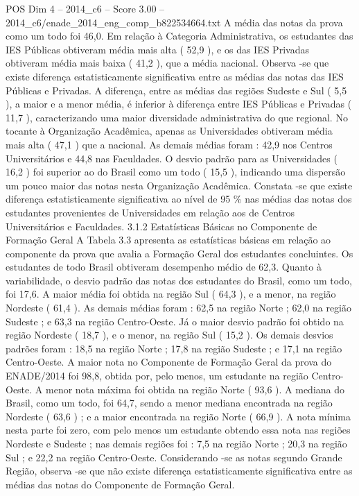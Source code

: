 \begin{textsample}{POS Dim 4 – 2014\_c6 – Score 3.00 – 2014\_c6/enade\_2014\_eng\_comp\_b822534664.txt}
A média das notas da prova como um todo foi 46,0.
Em relação à Categoria Administrativa, os estudantes das IES Públicas obtiveram média mais alta ( 52,9 ), e os das IES Privadas obtiveram média mais baixa ( 41,2 ), que a média nacional.
Observa -se que existe diferença estatisticamente significativa entre as médias das notas das IES Públicas e Privadas.
A diferença, entre as médias das regiões Sudeste e Sul ( 5,5 ), a maior e a menor média, é inferior à diferença entre IES Públicas e Privadas ( 11,7 ), caracterizando uma maior diversidade administrativa do que regional.
No tocante à Organização Acadêmica, apenas as Universidades obtiveram média mais alta ( 47,1 ) que a nacional.
As demais médias foram : 42,9 nos Centros Universitários e 44,8 nas Faculdades.
O desvio padrão para as Universidades ( 16,2 ) foi superior ao do Brasil como um todo ( 15,5 ), indicando uma dispersão um pouco maior das notas nesta Organização Acadêmica.
Constata -se que existe diferença estatisticamente significativa ao nível de 95 \% nas médias das notas dos estudantes provenientes de Universidades em relação aos de Centros Universitários e Faculdades. 3.1.2 Estatísticas Básicas no Componente de Formação Geral A Tabela 3.3 apresenta as estatísticas básicas em relação ao componente da prova que avalia a Formação Geral dos estudantes concluintes.
Os estudantes de todo Brasil obtiveram desempenho médio de 62,3.
Quanto à variabilidade, o desvio padrão das notas dos estudantes do Brasil, como um todo, foi 17,6.
A maior média foi obtida na região Sul ( 64,3 ), e a menor, na região Nordeste ( 61,4 ).
As demais médias foram : 62,5 na região Norte ; 62,0 na região Sudeste ; e 63,3 na região Centro-Oeste.
Já o maior desvio padrão foi obtido na região Nordeste ( 18,7 ), e o menor, na região Sul ( 15,2 ).
Os demais desvios padrões foram : 18,5 na região Norte ; 17,8 na região Sudeste ; e 17,1 na região Centro-Oeste.
A maior nota no Componente de Formação Geral da prova do ENADE/2014 foi 98,8, obtida por, pelo menos, um estudante na região Centro-Oeste.
A menor nota máxima foi obtida na região Norte ( 93,6 ).
A mediana do Brasil, como um todo, foi 64,7, sendo a menor mediana encontrada na região Nordeste ( 63,6 ) ; e a maior encontrada na região Norte ( 66,9 ).
A nota mínima nesta parte foi zero, com pelo menos um estudante obtendo essa nota nas regiões Nordeste e Sudeste ; nas demais regiões foi : 7,5 na região Norte ; 20,3 na região Sul ; e 22,2 na região Centro-Oeste.
Considerando -se as notas segundo Grande Região, observa -se que não existe diferença estatisticamente significativa entre as médias das notas do Componente de Formação Geral.

\end{textsample}
